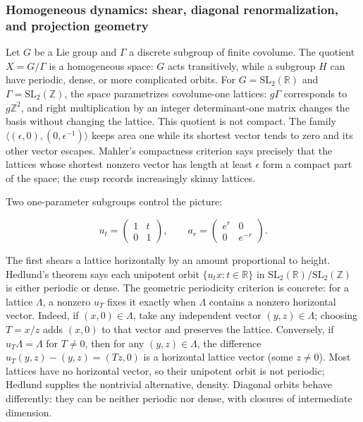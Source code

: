 \subsubsection{Homogeneous dynamics: shear, diagonal renormalization, and projection geometry}\label{04-visual-computing-ii-ch033-homogeneous-dynamics-shear-diagonal-renormalization-and-projection-geometry}

Let \(G\) be a Lie group and \(\Gamma\) a discrete subgroup of finite covolume. The quotient \(X=G/\Gamma\) is a homogeneous space: \(G\) acts transitively, while a subgroup \(H\) can have periodic, dense, or more complicated orbits. For \(G=\mathrm{SL}_2(\mathbb R)\) and \(\Gamma=\mathrm{SL}_2(\mathbb Z)\), the space parametrizes covolume-one lattices: \(g\Gamma\) corresponds to \(g\mathbb Z^2\), and right multiplication by an integer determinant-one matrix changes the basis without changing the lattice. This quotient is not compact. The family \(\langle(\epsilon,0),(0,\epsilon^{-1})\rangle\) keeps area one while its shortest vector tends to zero and its other vector escapes. Mahler's compactness criterion says precisely that the lattices whose shortest nonzero vector has length at least \(\epsilon\) form a compact part of the space; the cusp records increasingly skinny lattices.

Two one-parameter subgroups control the picture:

\[ u_t=\begin{pmatrix}1&t\\0&1\end{pmatrix},\qquad a_r=\begin{pmatrix}e^r&0\\0&e^{-r}\end{pmatrix}. \]

The first shears a lattice horizontally by an amount proportional to height. Hedlund's theorem says each unipotent orbit \(\{u_t x:t\in\mathbb R\}\) in \(\mathrm{SL}_2(\mathbb R)/\mathrm{SL}_2(\mathbb Z)\) is either periodic or dense. The geometric periodicity criterion is concrete: for a lattice \(\Lambda\), a nonzero \(u_T\) fixes it exactly when \(\Lambda\) contains a nonzero horizontal vector. Indeed, if \((x,0)\in\Lambda\), take any independent vector \((y,z)\in\Lambda\); choosing \(T=x/z\) adds \((x,0)\) to that vector and preserves the lattice. Conversely, if \(u_T\Lambda=\Lambda\) for \(T\neq0\), then for any \((y,z)\in\Lambda\), the difference \(u_T(y,z)-(y,z)=(Tz,0)\) is a horizontal lattice vector (some \(z\neq0\)). Most lattices have no horizontal vector, so their unipotent orbit is not periodic; Hedlund supplies the nontrivial alternative, density. Diagonal orbits behave differently: they can be neither periodic nor dense, with closures of intermediate dimension.

